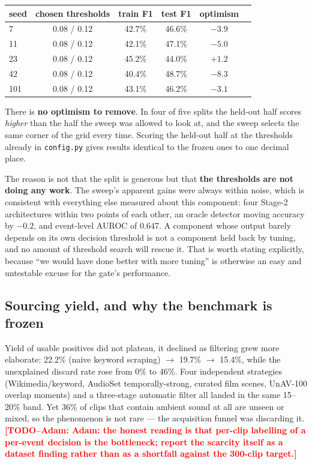 \documentclass[11pt,a4paper]{article}
\newcommand{\TODO}[1]{\textcolor{red}{\textbf{[TODO--Adam: #1]}}}
\begin{document}
\begin{center}\begin{tabular}{lccccc}
\toprule
seed & chosen thresholds & train F1 & test F1 & optimism \\
\midrule
7   & 0.08 / 0.12 & 42.7\% & 46.6\% & $-3.9$ \\
11  & 0.08 / 0.12 & 42.1\% & 47.1\% & $-5.0$ \\
23  & 0.08 / 0.12 & 45.2\% & 44.0\% & $+1.2$ \\
42  & 0.08 / 0.12 & 40.4\% & 48.7\% & $-8.3$ \\
101 & 0.08 / 0.12 & 43.1\% & 46.2\% & $-3.1$ \\
\bottomrule
\end{tabular}\end{center}

There is \textbf{no optimism to remove}. In four of five splits the held-out half scores
\emph{higher} than the half the sweep was allowed to look at, and the sweep selects the same corner
of the grid every time. Scoring the held-out half at the thresholds already in \texttt{config.py}
gives results identical to the frozen ones to one decimal place.

The reason is not that the split is generous but that \textbf{the thresholds are not doing any work}.
The sweep's apparent gains were always within noise, which is consistent with everything else
measured about this component: four Stage-2 architectures within two points of each other, an oracle
detector moving accuracy by $-0.2$, and event-level AUROC of 0.647. A component whose output barely
depends on its own decision threshold is not a component held back by tuning, and no amount of
threshold search will rescue it. That is worth stating explicitly, because ``we would have done
better with more tuning'' is otherwise an easy and untestable excuse for the gate's performance.

\subsection{Sourcing yield, and why the benchmark is frozen}
Yield of usable positives did not plateau, it declined as filtering grew more
elaborate: 22.2\% (naive keyword scraping) $\rightarrow$ 19.7\% $\rightarrow$ 15.4\%,
while the unexplained discard rate rose from 0\% to 46\%. Four independent strategies
(Wikimedia/keyword, AudioSet temporally-strong, curated film scenes, UnAV-100 overlap
moments) and a three-stage automatic filter all landed in the same 15--20\% band.
Yet 36\% of clips that contain ambient sound at all are unseen or mixed, so the
phenomenon is not rare --- the acquisition funnel was discarding it.
\TODO{Adam: the honest reading is that per-clip labelling of a per-event decision is
the bottleneck; report the scarcity itself as a dataset finding rather than as a
shortfall against the 300-clip target.}
\end{document}
